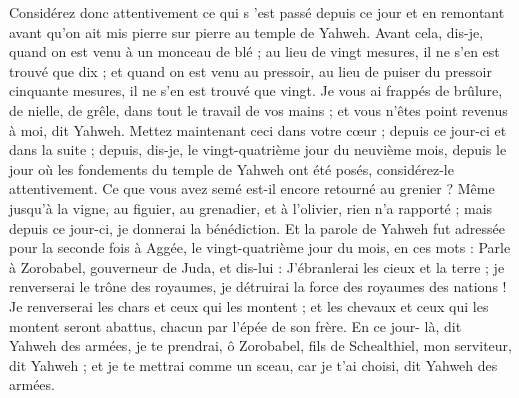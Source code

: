 \begin{multicols}{2}
Considérez donc attentivement ce qui s 'est passé depuis ce jour et en remontant avant qu'on ait mis pierre sur pierre au temple de Yahweh.
Avant cela, dis-je, quand on est venu à un monceau de blé ; au lieu de vingt mesures, il ne s'en est trouvé que dix ; et quand on est venu au pressoir, au lieu de puiser du pressoir cinquante mesures, il ne s'en est trouvé que vingt.
Je vous ai frappés de brûlure, de nielle, de grêle, dans tout le travail de vos mains ; et vous n'êtes point revenus à moi, dit Yahweh.
Mettez maintenant ceci dans votre cœur ; depuis ce jour-ci et dans la suite ; depuis, dis-je, le vingt-quatrième jour du neuvième mois, depuis le jour où les fondements du temple de Yahweh ont été posés, considérez-le attentivement.
Ce que vous avez semé est-il encore retourné au grenier ? Même jusqu'à la vigne, au figuier, au grenadier, et à l'olivier, rien n'a rapporté ; mais depuis ce jour-ci, je donnerai la bénédiction.
Et la parole de Yahweh fut adressée pour la seconde fois à Aggée, le vingt-quatrième jour du mois, en ces mots :
Parle à Zorobabel, gouverneur de Juda, et dis-lui : J'ébranlerai les cieux et la terre ;
je renverserai le trône des royaumes, je détruirai la force des royaumes des nations ! Je renverserai les chars et ceux qui les montent ; et les chevaux et ceux qui les montent seront abattus, chacun par l'épée de son frère.
En ce jour- là, dit Yahweh des armées, je te prendrai, ô Zorobabel, fils de Schealthiel, mon serviteur, dit Yahweh ; et je te mettrai comme un sceau, car je t'ai choisi, dit Yahweh des armées.
\PPE{}
\end{multicols}
